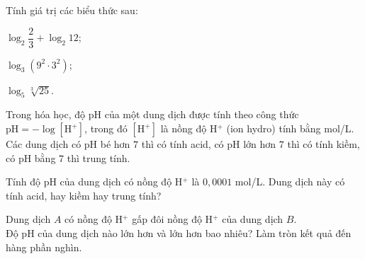 \begin{bt}%
	Tính giá trị các biểu thức sau:
	\begin{listEX}[3]
		\item[a)] $ \log_2 \dfrac{2}{3}+\log_2 12$;
		\item[b)] $ \log_3 \left(9^2\cdot 3^2\right)$;
		\item [c)] $ \log_5 \sqrt[3]{25}$.
	\end{listEX}
\end{bt}

\begin{bt}%
	Trong hóa học, độ  pH  của một dung dịch được tính theo công thức $\text{pH}=-\log[\text{H}^+] $, trong đó $ [\text{H}^+] $ là nồng độ  H$^+ $ (ion hydro) tính bằng mol/L. Các dung dịch có  pH  bé hơn $ 7 $ thì có tính acid, có pH  lớn hơn $ 7 $ thì có tính kiềm, có  pH  bằng $ 7 $ thì trung tính.
	\begin{listEX}[1]
		\item[a)] Tính độ  pH  của dung dịch có nồng độ H$^+ $ là $ 0{,}0001 $ mol/L. Dung dịch này có tính acid, hay kiềm hay trung tính?
		\item[b)] Dung dịch $ A $ có nồng độ  H$^+ $ gấp đôi nồng độ  H$^+ $ của dung dịch $ B $.\\
		Độ pH  của dung dịch nào lớn hơn và lớn hơn bao nhiêu? Làm tròn kết quả đến hàng phần nghìn.
	\end{listEX}
\end{bt}

